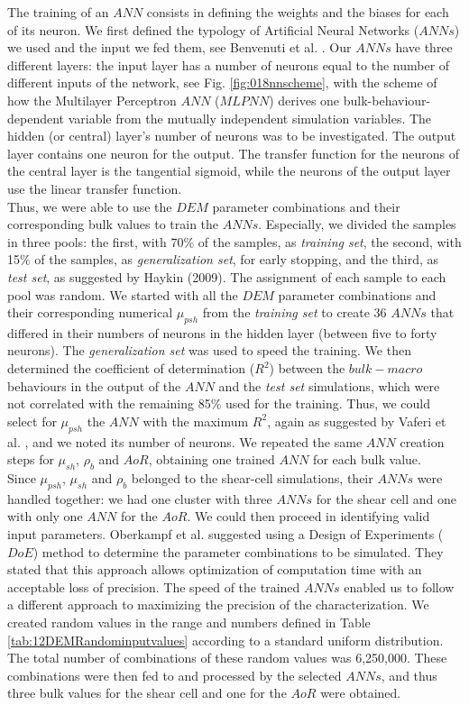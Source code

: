 The training of an $ANN$ consists in defining the weights and the biases for
each of its neuron.
We first defined the typology of Artificial Neural Networks ($ANNs$) we used and
the input we fed them, see Benvenuti et al. \cite{RefWorks:180}.
Our $ANNs$ have three different layers: the input layer has a number of neurons
equal to the number of different inputs of the network, see Fig.
\ref{fig:018nnscheme}, with the scheme of how the Multilayer Perceptron $ANN$ ($MLPNN$) derives one
bulk-behaviour-dependent variable from the mutually independent simulation variables.
The hidden (or central) layer's number of neurons was to be investigated. 
The output layer contains one neuron for the output.
The transfer function for the neurons of the central layer is the tangential
sigmoid, while the neurons of the output layer use the linear transfer
function.\\
Thus, we were able to use the $DEM$ parameter combinations and their
corresponding bulk values to train the $ANNs$.
Especially, we divided the samples in three pools: the first, with 70\% of the
samples, as \textit{training set}, the second, with 15\% of the samples, as
\textit{generalization set}, for early stopping, and the third, as \textit{test
set}, as suggested by Haykin (2009). The assignment of each sample to each pool
was random.
We started with all the $DEM$ parameter combinations and their corresponding
numerical $\mu_{psh}$ from the \textit{training set} to create 36 $ANNs$ that
differed in their numbers of neurons in the hidden layer (between five to forty neurons).
The \textit{generalization set} was used to speed the training. 
We then determined the coefficient of determination ($R^2$) between the
$bulk-macro$ behaviours in the output of the $ANN$ and the \textit{test
set} simulations, which were not correlated with the remaining 85\% used for the
training.
Thus, we could select for $\mu_{psh}$ the $ANN$ with the maximum $R^2$, 
again as suggested by Vaferi et al. \cite{RefWorks:150}, and we noted its number
of neurons.
We repeated the same $ANN$ creation steps for $\mu_{sh}$, $\rho_b$
and $AoR$, obtaining one trained $ANN$ for each bulk value. \\
Since $\mu_{psh}$, $\mu_{sh}$ and $\rho_b$ belonged to the shear-cell
simulations, their $ANNs$ were handled together: we had one cluster with three 
$ANNs$ for the shear cell and one with only one $ANN$ for the $AoR$.
We could then proceed in identifying valid input parameters.
Oberkampf et al. \cite{RefWorks:160} suggested using a Design of Experiments
($DoE$) method to determine the parameter combinations to be simulated.
They stated that this approach allows optimization of computation time
with an acceptable loss of precision.
The speed of the trained $ANNs$ enabled us to follow a different approach to
maximizing the precision of the characterization.
We created random values
in the range and numbers defined in Table \ref{tab:12DEMRandominputvalues}
according to a standard uniform distribution.
The total number of combinations of these random values was 6,250,000.
These combinations were then fed to and processed by the selected
$ANNs$, and thus three bulk values for the shear
cell and one for the $AoR$ were obtained.

